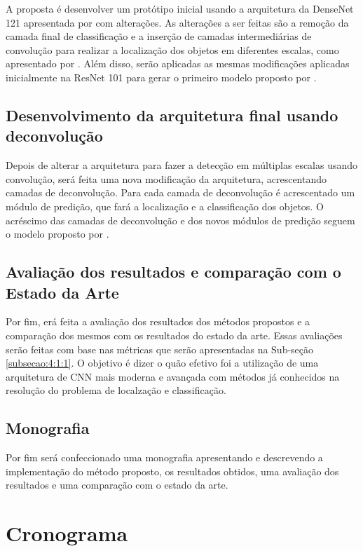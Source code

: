 A proposta é desenvolver um protótipo inicial usando a arquitetura da \ac{DenseNet} 121 apresentada por  com alterações. As alterações a ser feitas são a remoção da camada final de classificação e a inserção de camadas intermediárias de convolução para realizar a localização dos objetos em diferentes escalas, como apresentado por . Além disso, serão aplicadas as mesmas modificações aplicadas inicialmente na \ac{ResNet} 101 para gerar o primeiro modelo proposto por \cite{cheng-2017}.

\subsection{Desenvolvimento da arquitetura final usando deconvolução}
\label{subsecao:4:1:4}

Depois de alterar a arquitetura para fazer a detecção em múltiplas escalas usando convolução, será feita uma nova modificação da arquitetura, acrescentando camadas de deconvolução. Para cada camada de deconvolução é acrescentado um módulo de predição, que fará a localização e a classificação dos objetos. O acréscimo das camadas de deconvolução e dos novos módulos de predição seguem o modelo proposto por .

\subsection{Avaliação dos resultados e comparação com o Estado da Arte}
\label{subsecao:4:1:5}

Por fim, erá feita a avaliação dos resultados dos métodos propostos e a comparação dos mesmos com os resultados do estado da arte. Essas avaliações serão feitas com base nas métricas que serão apresentadas na Sub-seção \ref{subsecao:4:1:1}. O objetivo é dizer o quão efetivo foi a utilização de uma arquitetura de \ac{CNN} mais moderna e avançada com métodos já conhecidos na resolução do problema de localzação e classificação.

\subsection{Monografia}
\label{subsecao:4:1:6}

Por fim será confeccionado uma monografia apresentando e descrevendo a implementação do método proposto, os resultados obtidos, uma avaliação dos resultados e uma comparação com o estado da arte.

\section{Cronograma}
\label{secao:4:2}

